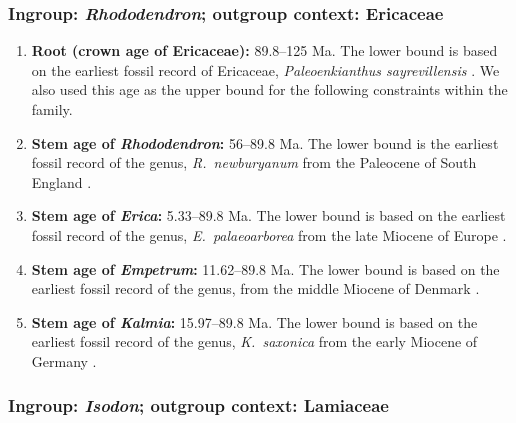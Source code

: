 \subsubsection*{Ingroup: \textit{Rhododendron}; outgroup context: Ericaceae}


\begin{enumerate}

\item \textbf{Root (crown age of Ericaceae):} 89.8--125 Ma. The lower
  bound is based on the earliest fossil record of Ericaceae,
  \textit{Paleoenkianthus sayrevillensis} \citep{Nixon1993}. We also
  used this age as the upper bound for the following constraints
  within the family.

\item \textbf{Stem age of \textit{Rhododendron}:} 56--89.8 Ma. The
  lower bound is the earliest fossil record of the genus,
  \textit{R.~newburyanum} from the Paleocene of South England
  \citep{Collinson1978}.

\item \textbf{Stem age of \textit{Erica}:} 5.33--89.8 Ma. The lower
  bound is based on the earliest fossil record of the genus,
  \textit{E.~palaeoarborea} from the late Miocene of Europe
  \citep{VanderBurgh1987}.

\item \textbf{Stem age of \textit{Empetrum}:} 11.62--89.8 Ma. The
  lower bound is based on the earliest fossil record of the genus,
  from the middle Miocene of Denmark \citep{Friis1979}.

\item \textbf{Stem age of \textit{Kalmia}:} 15.97--89.8 Ma. The lower
  bound is based on the earliest fossil record of the genus,
  \textit{K.~saxonica} from the early Miocene of Germany
  \citep{VanderBurgh1987}.

\end{enumerate}

\subsubsection*{Ingroup: \textit{Isodon}; outgroup context: Lamiaceae}

